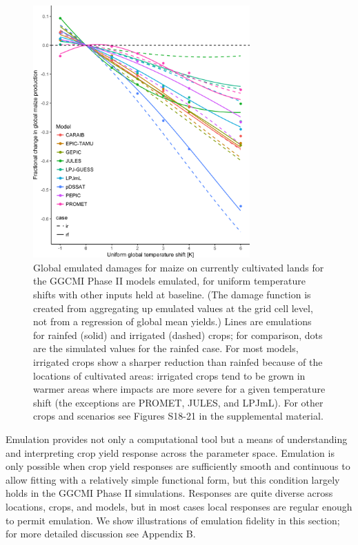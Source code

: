 \documentclass[esd, manuscript]{copernicus} %
\begin{document}
\begin{figure}[ht]
    \centering
    \includegraphics[width=8.3cm]{figures/global_em_maize.png}
    \caption{Global emulated damages for maize on currently cultivated lands for the GGCMI Phase II models emulated, for uniform temperature shifts with other inputs held at baseline. (The damage function is created from aggregating up emulated values at the grid cell level, not from a regression of global mean yields.) Lines are emulations for rainfed (solid) and irrigated (dashed) crops; for comparison, dots are the simulated values for the rainfed case.  For most models, irrigated crops show a sharper reduction than rainfed because of the locations of cultivated areas: irrigated crops tend to be grown in warmer areas where impacts are more severe for a given temperature shift (the exceptions are PROMET, JULES, and LPJmL). For other crops and scenarios see Figures S18-21 in the supplemental material.}
    \label{fig:globe_em}
\end{figure}

Emulation provides not only a computational tool but a means of understanding and interpreting crop yield response across the parameter space. Emulation is only possible  when crop yield responses are sufficiently smooth and continuous to allow fitting with a relatively simple functional form, but this condition largely holds in the GGCMI Phase II simulations. Responses are quite diverse across locations, crops, and models, but in most cases local responses are regular enough to permit emulation. We show illustrations of emulation fidelity in this section; for more detailed discussion see Appendix B.
\end{document}
